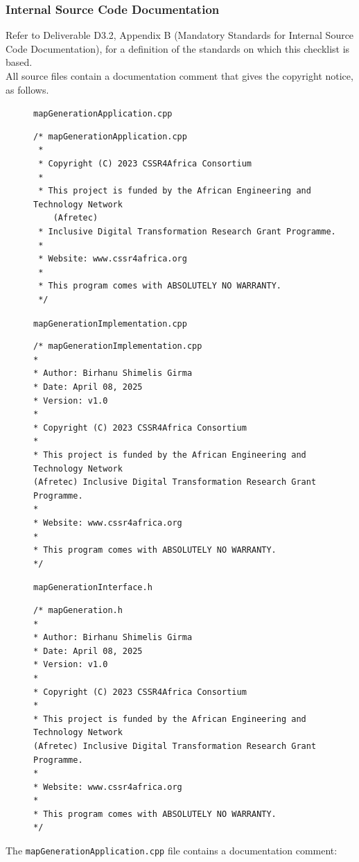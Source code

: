 \documentclass{CSSRforAfrica}
\newcommand{\blank}{~\\}
\newcommand{\checkboxChecked}{\fbox{\ding{51}}} %
\begin{document}
\begin{description}
\end{description}


 
 
\subsubsection{Internal Source Code Documentation}
\label{subsubsection:map_generation_documentation_standards}  
 
Refer to Deliverable D3.2, Appendix B (Mandatory Standards for Internal Source Code Documentation), for a definition of the standards on which this checklist is based.\\

\noindent All source files contain a documentation comment that gives the copyright notice, as follows.
 
\begin{description}

\item[\checkboxChecked] {\small \verb+mapGenerationApplication.cpp+}  
{\small \begin{verbatim}
/* mapGenerationApplication.cpp
 *
 * Copyright (C) 2023 CSSR4Africa Consortium
 * 
 * This project is funded by the African Engineering and Technology Network 
    (Afretec) 
 * Inclusive Digital Transformation Research Grant Programme. 
 *
 * Website: www.cssr4africa.org
 *
 * This program comes with ABSOLUTELY NO WARRANTY.
 */
\end{verbatim} }

\item[\checkboxChecked]  {\small \verb+mapGenerationImplementation.cpp+}  
{\small \begin{verbatim}
/* mapGenerationImplementation.cpp
*
* Author: Birhanu Shimelis Girma
* Date: April 08, 2025
* Version: v1.0
*
* Copyright (C) 2023 CSSR4Africa Consortium
*
* This project is funded by the African Engineering and Technology Network 
(Afretec) Inclusive Digital Transformation Research Grant Programme.
*
* Website: www.cssr4africa.org
*
* This program comes with ABSOLUTELY NO WARRANTY.
*/
\end{verbatim} }


\newpage
\item[\checkboxChecked] {\small \verb+mapGenerationInterface.h+}   
{\small \begin{verbatim}
/* mapGeneration.h
*
* Author: Birhanu Shimelis Girma
* Date: April 08, 2025
* Version: v1.0
*
* Copyright (C) 2023 CSSR4Africa Consortium
*
* This project is funded by the African Engineering and Technology Network 
(Afretec) Inclusive Digital Transformation Research Grant Programme.
*
* Website: www.cssr4africa.org
*
* This program comes with ABSOLUTELY NO WARRANTY.
*/
\end{verbatim} }


\end{description} 
%
\noindent The {\small \verb+mapGenerationApplication.cpp+} file contains a documentation comment:
\end{document}
